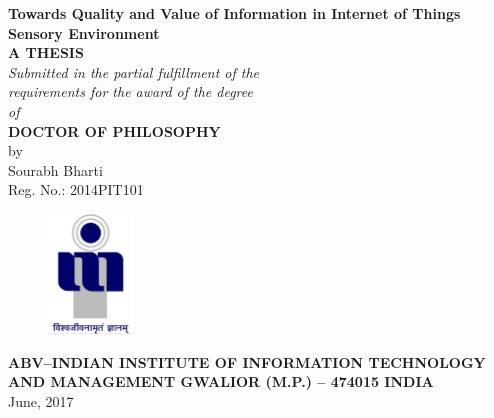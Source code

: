 \baselineskip=22pt
\begin{center}
{\bf \large{{\textup{\textbf{\textup{{Towards Quality and Value of Information in Internet of Things Sensory Environment}}}}}}
\\[0.4in]}
{\bf{\bf A THESIS}}\\[0.2in]
\emph{Submitted in the partial fulfillment of the\\
requirements for the award of the degree\\[0.2in]
of\\[0.2in]
}{\bf {{DOCTOR OF PHILOSOPHY}}}\\[0.5in]
by\\[0.2in]
{ {Sourabh Bharti}}\\[0.1in]
{Reg. No.: 2014PIT101}\\
\vspace{0.7in}
\begin{figure}[ht]
\centering
\includegraphics[height=1.25in,width=0.9in]{logo.pdf}\\
\end{figure}\vspace{0.8in}
{{\bf ABV--INDIAN INSTITUTE OF INFORMATION TECHNOLOGY AND MANAGEMENT GWALIOR (M.P.) -- 474015 INDIA\\[0.2in]}
}June, 2017
\end{center}
\newpage
